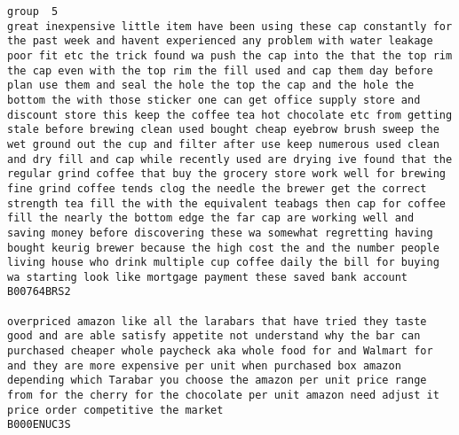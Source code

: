 \documentclass[11pt]{article}
\begin{document}
\begin{Verbatim}[commandchars=\\\{\}]
group  5
great inexpensive little item have been using these cap constantly for the past week and havent experienced any problem with water leakage poor fit etc the trick found wa push the cap into the that the top rim the cap even with the top rim the fill used and cap them day before plan use them and seal the hole the top the cap and the hole the bottom the with those sticker one can get office supply store and discount store this keep the coffee tea hot chocolate etc from getting stale before brewing clean used bought cheap eyebrow brush sweep the wet ground out the cup and filter after use keep numerous used clean and dry fill and cap while recently used are drying ive found that the regular grind coffee that buy the grocery store work well for brewing fine grind coffee tends clog the needle the brewer get the correct strength tea fill the with the equivalent teabags then cap for coffee fill the nearly the bottom edge the far cap are working well and saving money before discovering these wa somewhat regretting having bought keurig brewer because the high cost the and the number people living house who drink multiple cup coffee daily the bill for buying wa starting look like mortgage payment these saved bank account
B00764BRS2

overpriced amazon like all the larabars that have tried they taste good and are able satisfy appetite not understand why the bar can purchased cheaper whole paycheck aka whole food for and Walmart for and they are more expensive per unit when purchased box amazon depending which Tarabar you choose the amazon per unit price range from for the cherry for the chocolate per unit amazon need adjust it price order competitive the market
B000ENUC3S


\end{Verbatim}
\end{document}
